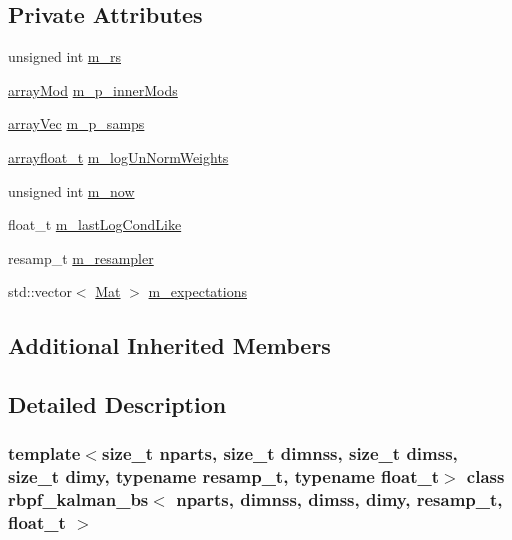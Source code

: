 \subsection*{Private Attributes}
\begin{DoxyCompactItemize}
\item 
unsigned int \hyperlink{classrbpf__kalman__bs_a0d8b3393bb7cb301a6719e56d2c646a9}{m\+\_\+rs}
\item 
\hyperlink{classrbpf__kalman__bs_a009e7dcc39c6a256a6de6ce36df7d033}{array\+Mod} \hyperlink{classrbpf__kalman__bs_a15975ae1d3e70b7bac82f09139d07250}{m\+\_\+p\+\_\+inner\+Mods}
\item 
\hyperlink{classrbpf__kalman__bs_ae4f4df4fb0cffea207901b0d358a519b}{array\+Vec} \hyperlink{classrbpf__kalman__bs_a301e07b418473f266af0b4ad05e82a04}{m\+\_\+p\+\_\+samps}
\item 
\hyperlink{classrbpf__kalman__bs_ae45e5522570234a1126f28fbe6a13c75}{arrayfloat\+\_\+t} \hyperlink{classrbpf__kalman__bs_a2f61f3dca55d4c7f32b408569a75f464}{m\+\_\+log\+Un\+Norm\+Weights}
\item 
unsigned int \hyperlink{classrbpf__kalman__bs_a84dfd5c00db5f3772430498585b776d6}{m\+\_\+now}
\item 
float\+\_\+t \hyperlink{classrbpf__kalman__bs_afb9c933b188a5bb70a35ab404515bde2}{m\+\_\+last\+Log\+Cond\+Like}
\item 
resamp\+\_\+t \hyperlink{classrbpf__kalman__bs_a9ec4d8c343bb45953ef2eac0e0e3210b}{m\+\_\+resampler}
\item 
std\+::vector$<$ \hyperlink{classrbpf__kalman__bs_add5db33a27f25ec3e72ecd8e4c9ce755}{Mat} $>$ \hyperlink{classrbpf__kalman__bs_abf448200e8922c6efa03d18b58712a39}{m\+\_\+expectations}
\end{DoxyCompactItemize}
\subsection*{Additional Inherited Members}


\subsection{Detailed Description}
\subsubsection*{template$<$size\+\_\+t nparts, size\+\_\+t dimnss, size\+\_\+t dimss, size\+\_\+t dimy, typename resamp\+\_\+t, typename float\+\_\+t$>$\newline
class rbpf\+\_\+kalman\+\_\+bs$<$ nparts, dimnss, dimss, dimy, resamp\+\_\+t, float\+\_\+t $>$}

